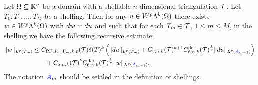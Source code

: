 \documentclass[10pt,letterpaper]{article}
\newcommand{\mwl}[1]{{\color{red}#1}}
\begin{document}
\begin{theorem}\label{theorem:poincarefriedrichsestimate:exterior}
    Let $\Omega \subseteq {\mathbb R}^{n}$ be a domain with a shellable $n$-dimensional triangulation ${\mathcal T}$.
    Let $T_0, T_1, \dots, T_M$ be a shelling.
    Then for any $u \in W^{p}\Lambda^{k}(\Omega)$ 
    there exists $w \in W^{p}\Lambda^{k}(\Omega)$ with $d w = d u$ 
    and such that for each $T_{m} \in {\mathcal T}$, $1 \leq m \leq M$, in the shelling
    we have the following recursive estimate: 
    \begin{align*}
        \| w \|_{L^{p}(T_{m})}
        &
        \leq  
        C_{{\rm PF},T_{m},\Gamma_{m},k,p}({\mathcal T}) 
        {\delta}(T)^{k} 
        \left( 
            \| d u      \|_{L^{p}(T_{m})} 
            +
            C_{5,n,k}({\mathcal T})^{k+1} 
            C^{\det}_{6,n,k}({\mathcal T})^{\frac 1 p} 
            \| d u \|_{L^{p}({\color{blue}A}_{m-1})}
        \right)
        \\&\qquad
        + 
        C_{5,n,k}({\mathcal T})^{k} 
        C^{\det}_{6,n,k}({\mathcal T})^{\frac 1 p} 
        \| w \|_{L^{p}({\color{blue}A}_{m-1})}
        .
    \end{align*}
    \mwl{The notation ${\color{blue}A}_m$ should be settled in the definition of shellings.}
\end{theorem}
\end{document}
